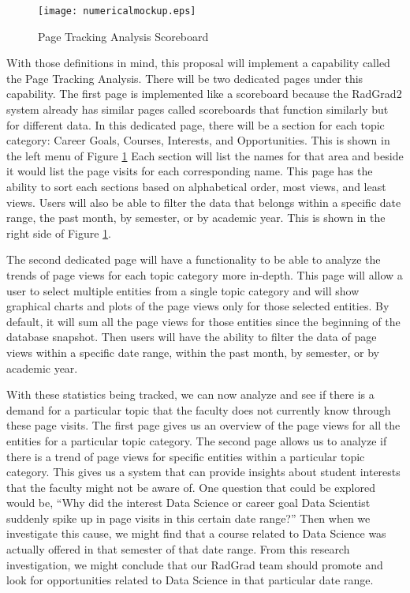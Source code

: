 \documentclass[english]{proposalnsf}
\begin{document}
    \begin{figure}[h]
        \texttt{[image: numericalmockup.eps]}
        \caption{Page Tracking Analysis Scoreboard}
        \label{fig:page-tracking-analysis-scoreboard}
    \end{figure}

    With those definitions in mind, this proposal will implement a capability called the Page Tracking Analysis. There
    will be two dedicated pages under this capability. The first page is implemented like a scoreboard because the
    RadGrad2 system already has similar pages called scoreboards that function similarly but for different data. In this
    dedicated page, there will be a section for each topic category: Career Goals, Courses, Interests, and Opportunities.
    This is shown in the left menu of Figure \ref{fig:page-tracking-analysis-scoreboard} Each section will list the names
    for that area and beside it would list the page visits for each corresponding name. This page has the ability to sort
    each sections based on alphabetical order, most views, and least views. Users will also be able to filter the data
    that belongs within a specific date range, the past month, by semester, or by academic year. This is shown in the right
    side of Figure \ref{fig:page-tracking-analysis-scoreboard}.

    The second dedicated page will have a functionality to be able to analyze the trends of page views for each topic
    category more in-depth. This page will allow a user to select multiple entities from a single topic category and will
    show graphical charts and plots of the page views only for those selected entities. By default, it will sum all the
    page views for those entities since the beginning of the database snapshot. Then users will have the ability to filter
    the data of page views within a specific date range, within the past month, by semester, or by academic year.


    With these statistics being tracked, we can now analyze and see if there is a demand for a particular topic that the
    faculty does not currently know through these page visits. The first page gives us an overview of the page views
    for all the entities for a particular topic category. The second page allows us to analyze if there is a trend of page
    views for specific entities within a particular topic category. This gives us a system that can provide insights about
    student interests that the faculty might not be aware of. One question that could be explored would be, ``Why did
    the interest Data Science or career goal Data Scientist suddenly spike up in page visits in this certain
    date range?'' Then when we investigate this cause, we might find that a course related to Data Science was actually
    offered in that semester of that date range. From this research investigation, we might conclude that our RadGrad
    team should promote and look for opportunities related to Data Science in that particular date range.
\end{document}
